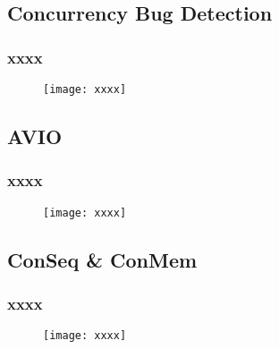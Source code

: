 \subsection{Concurrency Bug Detection} %
\begin{frame}[fragile]
    \frametitle{xxxx}
    \begin{figure}
    \texttt{[image: xxxx]}
    \end{figure}
\end{frame}
\subsection{AVIO} %
\begin{frame}[fragile]
    \frametitle{xxxx}
    \begin{figure}
    \texttt{[image: xxxx]}
    \end{figure}
\end{frame}
\subsection{ConSeq & ConMem} %
\begin{frame}[fragile]
    \frametitle{xxxx}
    \begin{figure}
    \texttt{[image: xxxx]}
    \end{figure}
\end{frame}

